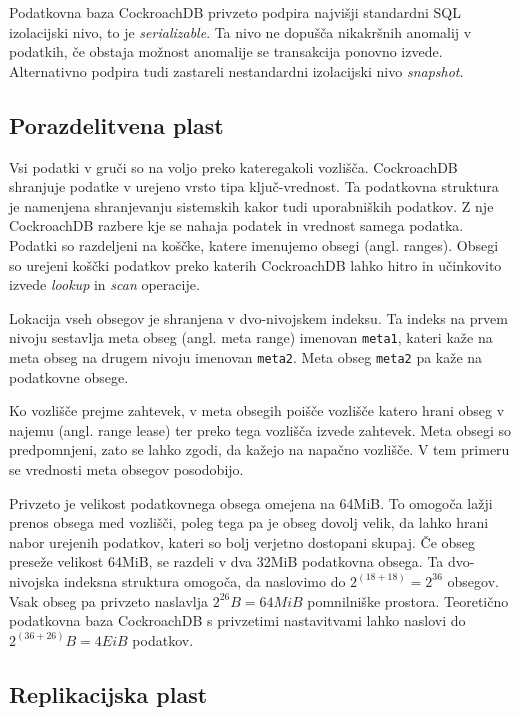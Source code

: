 \documentclass[a4paper, 12pt]{book}
\begin{document}
Podatkovna baza CockroachDB privzeto podpira najvišji standardni SQL izolacijski nivo, to je \textit{serializable}. Ta nivo ne dopušča nikakršnih anomalij v podatkih, če obstaja možnost anomalije se transakcija ponovno izvede. Alternativno podpira tudi zastareli nestandardni izolacijski nivo \textit{snapshot}.

 
\subsection{Porazdelitvena plast}

Vsi podatki v gruči so na voljo preko kateregakoli vozlišča. CockroachDB shranjuje podatke v urejeno vrsto tipa ključ-vrednost. Ta podatkovna stru\-ktu\-ra je namenjena shranjevanju sistemskih kakor tudi uporabniških podatkov. Z nje CockroachDB razbere kje se nahaja podatek in vrednost samega podatka. Podatki so razdeljeni na koščke, katere imenujemo obsegi (angl. ranges). Obsegi so urejeni koščki podatkov preko katerih CockroachDB lahko hitro in učinkovito izvede \textit{lookup} in \textit{scan} operacije.

Lokacija vseh obsegov je shranjena v dvo-nivojskem indeksu. Ta indeks na prvem nivoju sestavlja meta obseg (angl. meta range) imenovan \texttt{meta1}, kateri kaže na meta obseg na drugem nivoju imenovan \texttt{meta2}. Meta obseg \texttt{meta2} pa kaže na podatkovne obsege.

Ko vozlišče prejme zahtevek, v meta obsegih poišče vozlišče katero hrani obseg v najemu (angl. range lease) ter preko tega vozlišča izvede zahtevek. Meta obsegi so predpomnjeni, zato se lahko zgodi, da kažejo na napačno vozlišče. V tem primeru se vrednosti meta obsegov posodobijo.

Privzeto je velikost podatkovnega obsega omejena na 64MiB. To omogoča lažji prenos obsega med vozlišči, poleg tega pa je obseg dovolj velik, da lahko hrani nabor urejenih podatkov, kateri so bolj verjetno dostopani skupaj. Če obseg preseže velikost 64MiB, se razdeli v dva 32MiB podatkovna obsega. Ta dvo-nivojska indeksna struktura omogoča, da naslovimo do \(2^{(18 + 18)} = 2^{36}\) obsegov. Vsak obseg pa privzeto naslavlja \(2^{26}B = 64MiB\) pomnilniške prostora. Teoretično podatkovna baza CockroachDB s privzetimi nastavitvami lahko naslovi do \(2^{(36+26)}B = 4EiB\) podatkov. 

\subsection{Replikacijska plast}
\end{document}

